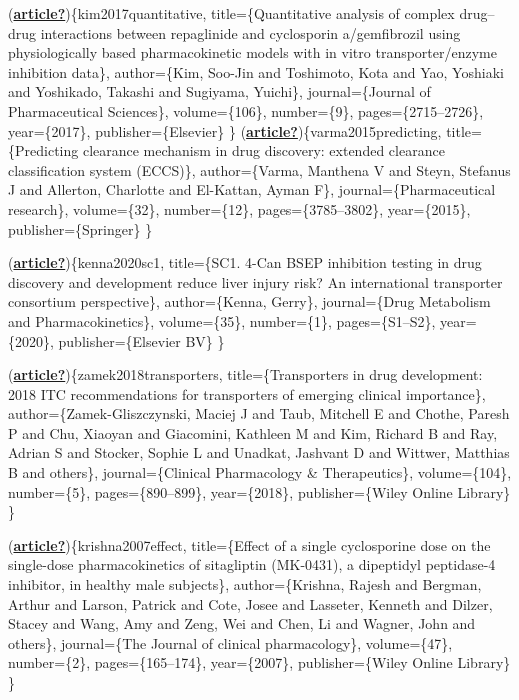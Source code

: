 \documentclass[
  11pt,
  krantz2, a4paper, twoside]{krantz}
\begin{document}
(\protect\hyperlink{ref-article}{\textbf{article?}})\{kim2017quantitative,
title=\{Quantitative analysis of complex drug--drug interactions between repaglinide and cyclosporin a/gemfibrozil using physiologically based pharmacokinetic models with in vitro transporter/enzyme inhibition data\},
author=\{Kim, Soo-Jin and Toshimoto, Kota and Yao, Yoshiaki and Yoshikado, Takashi and Sugiyama, Yuichi\},
journal=\{Journal of Pharmaceutical Sciences\},
volume=\{106\},
number=\{9\},
pages=\{2715--2726\},
year=\{2017\},
publisher=\{Elsevier\}
\}
(\protect\hyperlink{ref-article}{\textbf{article?}})\{varma2015predicting,
title=\{Predicting clearance mechanism in drug discovery: extended clearance classification system (ECCS)\},
author=\{Varma, Manthena V and Steyn, Stefanus J and Allerton, Charlotte and El-Kattan, Ayman F\},
journal=\{Pharmaceutical research\},
volume=\{32\},
number=\{12\},
pages=\{3785--3802\},
year=\{2015\},
publisher=\{Springer\}
\}

(\protect\hyperlink{ref-article}{\textbf{article?}})\{kenna2020sc1,
title=\{SC1. 4-Can BSEP inhibition testing in drug discovery and development reduce liver injury risk? An international transporter consortium perspective\},
author=\{Kenna, Gerry\},
journal=\{Drug Metabolism and Pharmacokinetics\},
volume=\{35\},
number=\{1\},
pages=\{S1--S2\},
year=\{2020\},
publisher=\{Elsevier BV\}
\}

(\protect\hyperlink{ref-article}{\textbf{article?}})\{zamek2018transporters,
title=\{Transporters in drug development: 2018 ITC recommendations for transporters of emerging clinical importance\},
author=\{Zamek-Gliszczynski, Maciej J and Taub, Mitchell E and Chothe, Paresh P and Chu, Xiaoyan and Giacomini, Kathleen M and Kim, Richard B and Ray, Adrian S and Stocker, Sophie L and Unadkat, Jashvant D and Wittwer, Matthias B and others\},
journal=\{Clinical Pharmacology \& Therapeutics\},
volume=\{104\},
number=\{5\},
pages=\{890--899\},
year=\{2018\},
publisher=\{Wiley Online Library\}
\}

(\protect\hyperlink{ref-article}{\textbf{article?}})\{krishna2007effect,
title=\{Effect of a single cyclosporine dose on the single-dose pharmacokinetics of sitagliptin (MK-0431), a dipeptidyl peptidase-4 inhibitor, in healthy male subjects\},
author=\{Krishna, Rajesh and Bergman, Arthur and Larson, Patrick and Cote, Josee and Lasseter, Kenneth and Dilzer, Stacey and Wang, Amy and Zeng, Wei and Chen, Li and Wagner, John and others\},
journal=\{The Journal of clinical pharmacology\},
volume=\{47\},
number=\{2\},
pages=\{165--174\},
year=\{2007\},
publisher=\{Wiley Online Library\}
\}
\end{document}
